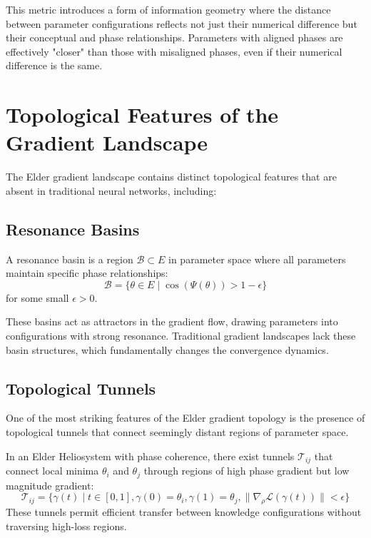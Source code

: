 This metric introduces a form of information geometry where the distance between parameter configurations reflects not just their numerical difference but their conceptual and phase relationships. Parameters with aligned phases are effectively "closer" than those with misaligned phases, even if their numerical difference is the same.

\section{Topological Features of the Gradient Landscape}

The Elder gradient landscape contains distinct topological features that are absent in traditional neural networks, including:

\subsection{Resonance Basins}

\begin{definition}
A resonance basin is a region $\mathcal{B} \subset E$ in parameter space where all parameters maintain specific phase relationships:
\begin{equation}
\mathcal{B} = \{\theta \in E \mid \cos(\Psi(\theta)) > 1 - \epsilon\}
\end{equation}
for some small $\epsilon > 0$.
\end{definition}

These basins act as attractors in the gradient flow, drawing parameters into configurations with strong resonance. Traditional gradient landscapes lack these basin structures, which fundamentally changes the convergence dynamics.

\subsection{Topological Tunnels}

One of the most striking features of the Elder gradient topology is the presence of topological tunnels that connect seemingly distant regions of parameter space.

\begin{theorem}
In an Elder Heliosystem with phase coherence, there exist tunnels $\mathcal{T}_{ij}$ that connect local minima $\theta_i$ and $\theta_j$ through regions of high phase gradient but low magnitude gradient:
\begin{equation}
\mathcal{T}_{ij} = \{\gamma(t) \mid t \in [0,1], \gamma(0) = \theta_i, \gamma(1) = \theta_j, \|\nabla_{\rho}\mathcal{L}(\gamma(t))\| < \epsilon\}
\end{equation}
These tunnels permit efficient transfer between knowledge configurations without traversing high-loss regions.
\end{theorem}

